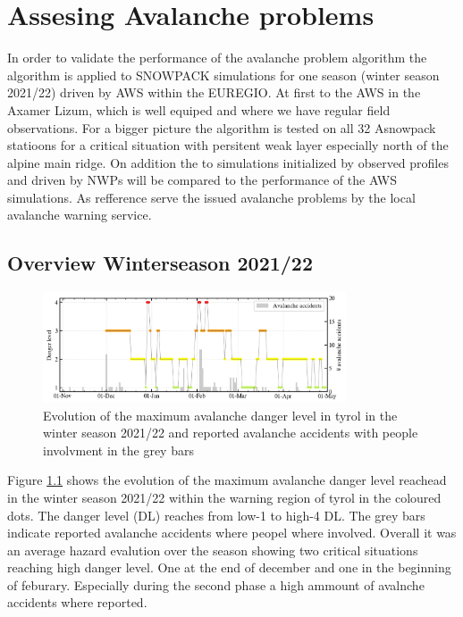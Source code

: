 \chapter{Assesing Avalanche problems }


In order to validate the performance of the avalanche problem algorithm the algorithm is applied to 
SNOWPACK simulations for one season (winter season 2021/22) driven by AWS within the EUREGIO. At first to the
AWS in the Axamer Lizum, which is well equiped and where we have regular field observations. For a bigger
picture the algorithm is tested on all 32 Asnowpack statioons for a critical situation with persitent weak layer 
especially north of the alpine main ridge. On addition the to simulations initialized by observed profiles and driven by NWPs
will be compared to the performance of the AWS simulations. As refference serve the issued avalanche problems by the local
avalanche warning service. 

\section{Overview Winterseason 2021/22} \label{sec:Results_overview}

\begin{figure}[h]
    \centering
    \includegraphics[width=0.8\textwidth]{Figures/figures_avapro/Dangerlevel_tirol.png}
    \caption{Evolution of the maximum avalanche danger level in tyrol in the winter season
     2021/22 and reported avalanche accidents with people involvment in the grey bars }
    \label{fig:dangerlevel_evolution}
\end{figure}

\noindent Figure \ref{fig:dangerlevel_evolution} shows the evolution of the maximum avalanche danger level reachead in
 the winter season 2021/22 within the warning region of tyrol in the coloured dots. The danger level (DL) reaches from low-1 
 to high-4 DL. The grey bars indicate reported avalanche accidents where peopel where involved. Overall it was an average
 hazard evalution over the season showing two critical situations reaching high danger level. One at the end of december and
one in the beginning of feburary. Especially during the second phase a high ammount of avalnche accidents where reported. 




